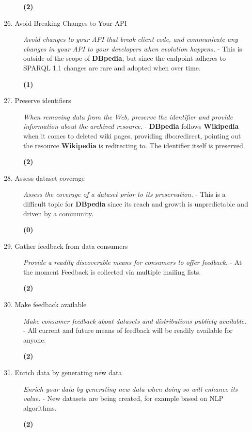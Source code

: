 \documentclass[a4paper,english,twoside,BCOR1.5cm,headsepline,DIV12,appendixprefix,final,12pt]{scrbook}
\newcommand{\dbpedia}{{\ttfamily\bfseries DBpedia}\xspace}
\newcommand{\wikipedia}{{\ttfamily\bfseries Wikipedia}\xspace}
\begin{document}
\begin{description}
\begin{flushright}\color{ForestGreen}\textbf{(2)}\end{flushright}
 \item[26. Avoid Breaking Changes to Your API] \textit{Avoid changes to your API that break client code, and communicate any changes in your API to your developers when evolution happens.} - This is outside of the scope of \dbpedia, but since the endpoint adheres to SPARQL 1.1 changes are rare and adopted when over time.
\begin{flushright}\color{BurntOrange}\textbf{(1)}\end{flushright}
 \item[27. Preserve identifiers] \textit{When removing data from the Web, preserve the identifier and provide information about the archived resource.} - \dbpedia follows \wikipedia when it comes to deleted wiki pages, providing dbo:redirect, pointing out the resource \wikipedia is redirecting to. The identifier itself is preserved.
\begin{flushright}\color{ForestGreen}\textbf{(2)}\end{flushright}
 \item[28. Assess dataset coverage] \textit{Assess the coverage of a dataset prior to its preservation.} - This is a difficult topic for \dbpedia since its reach and growth is unpredictable and driven by a community.
\begin{flushright}\color{Mahogany}\textbf{(0)}\end{flushright}
 \item[29. Gather feedback from data consumers] \textit{Provide a readily discoverable means for consumers to offer feedback.} - At the moment Feedback is collected via multiple mailing lists.
\begin{flushright}\color{ForestGreen}\textbf{(2)}\end{flushright}
 \item[30. Make feedback available] \textit{Make consumer feedback about datasets and distributions publicly available.} - All current and future means of feedback will be readily available for anyone.
\begin{flushright}\color{ForestGreen}\textbf{(2)}\end{flushright}
 \item[31. Enrich data by generating new data] \textit{Enrich your data by generating new data when doing so will enhance its value.} - New datasets are being created, for example based on NLP algorithms.
\begin{flushright}\color{ForestGreen}\textbf{(2)}\end{flushright}

\end{description}
\end{document}
